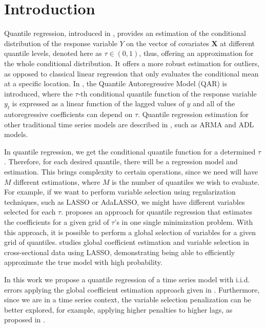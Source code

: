 \documentclass[aoas]{imsart}
\numberwithin{equation}{section}
\theoremstyle{plain}
\theoremstyle{remark}
\begin{document}
\hypertarget{introduction}{%
\section{Introduction}\label{introduction}}

Quantile regression, introduced in \citet{Koenker1978}, provides an
estimation of the conditional distribution of the response variable
\(Y\) on the vector of covariates \(\mathbf{X}\) at different quantile
levels, denoted here as \(\tau\in(0,1)\), thus, offering an
approximation for the whole conditional distribution. It offers a more
robust estimation for outliers, as opposed to classical linear
regression that only evaluates the conditional mean at a specific
location. \citep{Davino2014} In \citet{Koenker2005}, the Quantile
Autoregressive Model (QAR) is introduced, where the \(\tau\)-th
conditional quantile function of the response variable \(y_t\) is
expressed as a linear function of the lagged values of \(y\) and all of
the autoregressive coefficients can depend on \(\tau\). Quantile
regression estimation for other traditional time series models are
described in \citet{Koenker2018}, such as ARMA and ADL models.

In quantile regression, we get the conditional quantile function for a
determined \(\tau\). Therefore, for each desired quantile, there will be
a regression model and estimation. This brings complexity to certain
operations, since we need will have \(M\) different estimations, where
\(M\) is the number of quantiles we wish to evaluate. For example, if we
want to perform variable selection using regularization techniques, such
as LASSO or AdaLASSO, we might have different variables selected for
each \(\tau\). \citet{Sottile2020} proposes an approach for quantile
regression that estimates the coefficients for a given grid of
\(\tau\)'s in one single minimization problem. With this approach, it is
possible to perform a global selection of variables for a given grid of
quantiles. \citet{Sottile2020} studies global coefficient estimation and
variable selection in cross-sectional data using LASSO, demonstrating
being able to efficiently approximate the true model with high
probability.

In this work we propose a quantile regression of a time series model
with i.i.d. errors applying the global coefficient estimation approach
given in \citet{Sottile2020}. Furthermore, since we are in a time series
context, the variable selection penalization can be better explored, for
example, applying higher penalties to higher lags, as proposed in
\citet{Konzen2016}.
\end{document}
